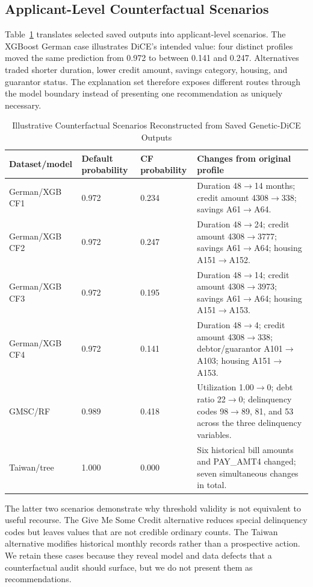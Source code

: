 \documentclass[conference]{IEEEtran}
\begin{document}
\subsection{Applicant-Level Counterfactual Scenarios}
Table~\ref{tab:scenarios} translates selected saved outputs into applicant-level scenarios. The XGBoost German case illustrates DiCE's intended value: four distinct profiles moved the same prediction from 0.972 to between 0.141 and 0.247. Alternatives traded shorter duration, lower credit amount, savings category, housing, and guarantor status. The explanation set therefore exposes different routes through the model boundary instead of presenting one recommendation as uniquely necessary.

\begin{table}[t]
\caption{Illustrative Counterfactual Scenarios Reconstructed from Saved Genetic-DiCE Outputs}
\label{tab:scenarios}
\centering\scriptsize
\begin{tabular}{p{1.7cm}p{1.4cm}p{1.5cm}p{10.3cm}}
\toprule
Dataset/model & Default probability & CF probability & Changes from original profile \\
\midrule
German/XGB CF1 & 0.972 & 0.234 & Duration 48$\rightarrow$14 months; credit amount 4308$\rightarrow$338; savings A61$\rightarrow$A64. \\
German/XGB CF2 & 0.972 & 0.247 & Duration 48$\rightarrow$24; credit amount 4308$\rightarrow$3777; savings A61$\rightarrow$A64; housing A151$\rightarrow$A152. \\
German/XGB CF3 & 0.972 & 0.195 & Duration 48$\rightarrow$14; credit amount 4308$\rightarrow$3973; savings A61$\rightarrow$A64; housing A151$\rightarrow$A153. \\
German/XGB CF4 & 0.972 & 0.141 & Duration 48$\rightarrow$4; credit amount 4308$\rightarrow$338; debtor/guarantor A101$\rightarrow$A103; housing A151$\rightarrow$A153. \\
GMSC/RF & 0.989 & 0.418 & Utilization 1.00$\rightarrow$0; debt ratio 22$\rightarrow$0; delinquency codes 98$\rightarrow$89, 81, and 53 across the three delinquency variables. \\
Taiwan/tree & 1.000 & 0.000 & Six historical bill amounts and PAY\_AMT4 changed; seven simultaneous changes in total. \\
\bottomrule
\end{tabular}
\end{table}

The latter two scenarios demonstrate why threshold validity is not equivalent to useful recourse. The Give Me Some Credit alternative reduces special delinquency codes but leaves values that are not credible ordinary counts. The Taiwan alternative modifies historical monthly records rather than a prospective action. We retain these cases because they reveal model and data defects that a counterfactual audit should surface, but we do not present them as recommendations.
\end{document}
